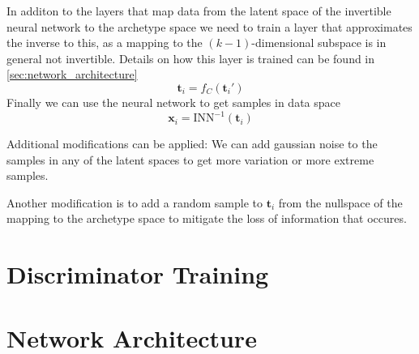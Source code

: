In additon to the layers that map data from the latent space of the invertible
neural network to the archetype space we need to train a layer that
approximates the inverse to this, as a mapping to the $(k-1)$-dimensional
subspace is in general not invertible. Details on how this layer is trained can
be found in \autoref{sec:network_architecture}
\begin{equation}%
    \label{eq:aa_upsample}
    \mathbf{t}_i = f_C (\mathbf{t}_i')
\end{equation}
Finally we can use the neural network to get samples in data space
\begin{equation}%
    \label{eq:aa_to_data}
    \mathbf{x}_i = \mathrm{INN}^{-1} (\mathbf{t}_i)
\end{equation}

Additional modifications can be applied: We can add gaussian noise to the
samples in any of the latent spaces to get more variation or more extreme
samples.

Another modification is to add a random sample to $\mathbf{t}_i$ from the
nullspace of the mapping to the archetype space to mitigate the loss of
information that occures.

\section{Discriminator Training}%
\label{sec:discriminator_training}


\section{Network Architecture}%
\label{sec:network_architecture}

\begin{figure}[htpb]
\begin{center}
\end{center}
\caption{}%
\label{fig:}
\end{figure}


